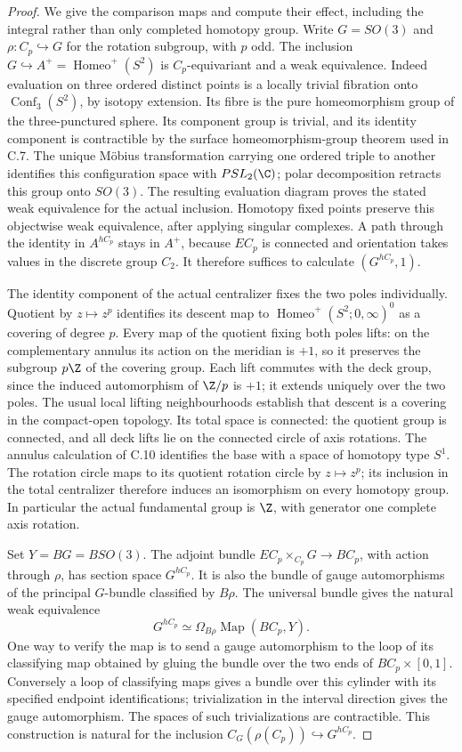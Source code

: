 \begin{proof}
We give the comparison maps and compute their effect, including the integral
rather than only completed homotopy group. Write $G=SO(3)$ and
$\rho:C_p\hookrightarrow G$ for the rotation subgroup, with $p$ odd.
The inclusion $G\hookrightarrow A^+=\operatorname{Homeo}^+(S^2)$ is
$C_p$-equivariant and a weak equivalence. Indeed evaluation on three
ordered distinct points is a locally trivial fibration onto
$\operatorname{Conf}_3(S^2)$, by isotopy extension. Its fibre is the
pure homeomorphism group of the three-punctured sphere. Its component
group is trivial, and its identity component is contractible by the
surface homeomorphism-group theorem used in C.7. The unique M\"obius
transformation carrying one ordered triple to another identifies this
configuration space with $PSL_2(\C)$; polar decomposition retracts this
group onto $SO(3)$. The resulting evaluation diagram proves the stated
weak equivalence for the actual inclusion. Homotopy fixed points preserve
this objectwise weak equivalence, after applying singular complexes. A
path through the identity in $A^{hC_p}$ stays in $A^+$, because $EC_p$
is connected and orientation takes values in the discrete group $C_2$.
It therefore suffices to calculate $(G^{hC_p},1)$.

The identity component of the actual centralizer fixes the two poles
individually. Quotient by $z\mapsto z^p$ identifies its descent map to
$\operatorname{Homeo}^+(S^2;0,\infty)^0$ as a covering of degree $p$.
Every map of the quotient fixing both poles lifts: on the complementary
annulus its action on the meridian is $+1$, so it preserves the subgroup
$p\Z$ of the covering group. Each lift commutes with the deck group,
since the induced automorphism of $\Z/p$ is $+1$; it extends uniquely
over the two poles. The usual local lifting neighbourhoods establish
that descent is a covering in the compact-open topology. Its total space
is connected: the quotient group is connected, and all deck lifts lie
on the connected circle of axis rotations. The annulus calculation of
C.10 identifies the base with a space of homotopy type $S^1$. The
rotation circle maps to its quotient rotation circle by $z\mapsto z^p$;
its inclusion in the total centralizer therefore induces an isomorphism
on every homotopy group. In particular the actual fundamental group is
$\Z$, with generator one complete axis rotation.

Set $Y=BG=BSO(3)$. The adjoint bundle
$EC_p\times_{C_p}G\to BC_p$, with action through $\rho$, has section
space $G^{hC_p}$. It is also the bundle of gauge automorphisms of the
principal $G$-bundle classified by $B\rho$. The universal bundle gives
the natural weak equivalence
\[
 G^{hC_p}\simeq
 \Omega_{B\rho}\operatorname{Map}(BC_p,Y).
\]
One way to verify the map is to send a gauge automorphism to the loop
of its classifying map obtained by gluing the bundle over the two ends
of $BC_p\times[0,1]$. Conversely a loop of classifying maps gives a
bundle over this cylinder with its specified endpoint identifications;
trivialization in the interval direction gives the gauge automorphism.
The spaces of such trivializations are contractible. This construction
is natural for the inclusion $C_G(\rho(C_p))\hookrightarrow G^{hC_p}$.


\end{proof}
